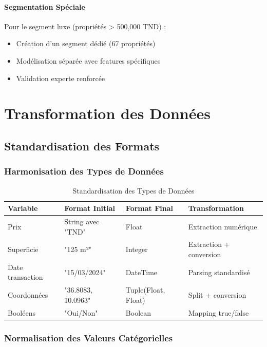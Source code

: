 \paragraph{Segmentation Spéciale}
Pour le segment luxe (propriétés > 500,000 TND) :

\begin{itemize}
    \item Création d'un segment dédié (67 propriétés)
    \item Modélisation séparée avec features spécifiques
    \item Validation experte renforcée
\end{itemize}

\section{Transformation des Données}
\label{sec:transformation_donnees}

\subsection{Standardisation des Formats}
\label{subsec:standardisation_formats}

\subsubsection{Harmonisation des Types de Données}

\begin{table}[H]
\centering
\caption{Standardisation des Types de Données}
\begin{tabular}{|l|l|l|l|}
\hline
\textbf{Variable} & \textbf{Format Initial} & \textbf{Format Final} & \textbf{Transformation} \\
\hline
Prix & String avec "TND" & Float & Extraction numérique \\
\hline
Superficie & "125 m²" & Integer & Extraction + conversion \\
\hline
Date transaction & "15/03/2024" & DateTime & Parsing standardisé \\
\hline
Coordonnées & "36.8083, 10.0963" & Tuple(Float, Float) & Split + conversion \\
\hline
Booléens & "Oui/Non" & Boolean & Mapping true/false \\
\hline
\end{tabular}
\label{tab:standardisation_types}
\end{table}

\subsubsection{Normalisation des Valeurs Catégorielles}

